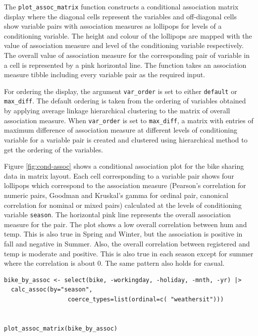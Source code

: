The \texttt{plot\_assoc\_matrix} function constructs a conditional association matrix display where the diagonal cells represent the variables and off-diagonal cells show variable pairs with association measures as lollipops for levels of a conditioning variable. The height and colour of the lollipops are mapped with the value of association measure and level of the conditioning variable respectively. The overall value of association measure for the corresponding pair of variable in a cell is represented by a pink horizontal line. The function takes an association measure tibble including every variable pair as the required input.

For ordering the display, the argument \texttt{var\_order} is set to either \texttt{default} or \texttt{max\_diff}. The default ordering is taken from the ordering of variables obtained by applying average linkage hierarchical clustering to the matrix of overall association measure. When \texttt{var\_order} is set to \texttt{max\_diff}, a matrix with entries of maximum difference of association measure at different levels of conditioning variable for a variable pair is created and clustered using hierarchical method to get the ordering of the variables.

Figure \ref{fig:cond-assoc} shows a conditional association plot for the bike sharing data in matrix layout. Each cell corresponding to a variable pair shows four lollipops which correspond to the association measure (Pearson's correlation for numeric pairs, Goodman and Kruskal's gamma for ordinal pair, canonical correlation for nominal or mixed pairs) calculated at the levels of conditioning variable \texttt{season}. The horizontal pink line represents the overall association measure for the pair. The plot shows a low overall correlation between hum and temp. This is also true in Spring and Winter, but the association is positive in fall and negative in Summer. Also, the overall correlation between registered and temp is moderate and positive. This is also true in each season except for summer where
the correlation is about 0. The same pattern also holds for casual.

\begin{verbatim}
bike_by_assoc <- select(bike, -workingday, -holiday, -mnth, -yr) |>
  calc_assoc(by="season", 
                  coerce_types=list(ordinal=c( "weathersit")))


plot_assoc_matrix(bike_by_assoc)
\end{verbatim}

